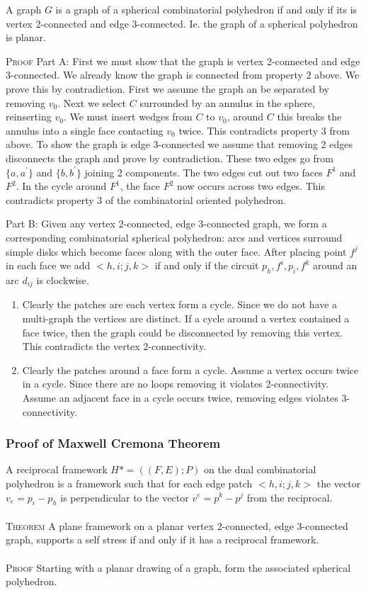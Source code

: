 \documentclass[english]{article}
\begin{document}
A graph $G$ is a graph of a spherical combinatorial polyhedron if and only if its is vertex 2-connected and edge 3-connected. Ie. the graph of a spherical polyhedron is planar.

\textsc{Proof}
Part A: First we must show that the graph is vertex 2-connected and edge 3-connected. We already know the graph is connected from property 2 above. We prove this by contradiction. First we assume the graph an be separated by removing $v_0$. Next we select $C$ surrounded by an annulus in the sphere, reinserting $v_0$. We must insert wedges from $C$ to $v_0$, around $C$ this breaks the annulus into a single face contacting $v_0$ twice. This contradicts property 3 from above.
To show the graph is edge 3-connected we assume that removing 2 edges disconnects the graph and prove by contradiction. These two edges go from $\{a,a^{'}\}$ and $\{b, b^{'}\}$ joining 2 components. The two edges cut out two faces $F^1$ and $F^2$. In the cycle around $F^1$, the face $F^2$ now occurs across two edges. This contradicts property 3 of the combinatorial oriented polyhedron.

Part B:
Given any vertex 2-connected, edge 3-connected graph, we form a corresponding combinatorial spherical polyhedron: arcs and vertices surround simple disks which become faces along with the outer face. After placing point $f^j$ in each face we add $<h,i;j,k>$ if and only if the circuit $p_h, f^i,p_i,f^k$ around an arc $d_{ij}$ is clockwise. 

\begin{enumerate}
	\item Clearly the patches are each vertex form a cycle. Since we do not have a multi-graph the vertices are distinct. If a cycle around a vertex contained a face twice, then the graph could be disconnected by removing this vertex. This contradicts the vertex 2-connectivity. 
	\item Clearly the patches around a face form a cycle. Assume a vertex occurs twice in a cycle. Since there are no loops removing it violates 2-connectivity. Assume an adjacent face in a cycle occurs twice, removing edges violates 3-connectivity.
\end{enumerate}

\subsubsection{Proof of Maxwell Cremona Theorem}
A reciprocal framework $H* = ((F,E);P)$ on the dual combinatorial polyhedron is a framework such that for each edge patch $<h,i;j,k>$  the vector $v_e = p_i - p_h$ is perpendicular to the vector $v^e = p^k - p^j$ from the reciprocal. \\
\\
\textsc{Theorem} A plane framework on a planar vertex 2-connected, edge 3-connected graph, supports a self stress if and only if it has a reciprocal framework. \\
\\
\textsc{Proof} Starting with a planar drawing of a graph, form the associated spherical polyhedron. 
\end{document}
